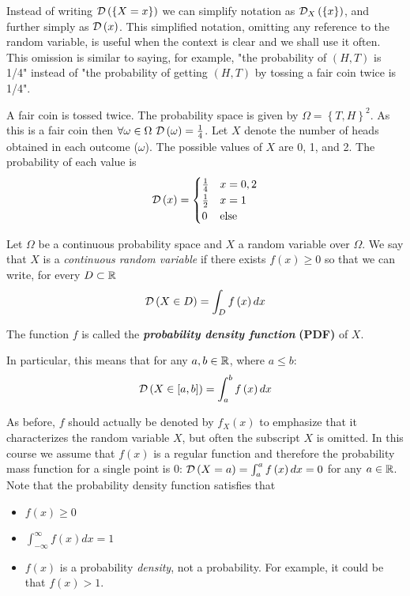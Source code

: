 Instead of writing $\mathcal{D}\left(\left\{ X=x\right\} \right)$ we can simplify notation as $\mathcal{D}_X\left(\left\{ x\right\} \right)$, and further simply as $\mathcal{D}\left(x\right)$. This simplified notation, omitting any reference to the random variable, is useful when the context is clear and we shall use it often. This omission is similar to saying, for example,  "the probability of $\left(H,T\right)$ is 1/4" instead of "the probability of getting $\left(H,T\right)$ by tossing a fair coin twice is 1/4".

\begin{example}
A fair coin is tossed twice. The probability space is given by $\Omega=\left\{ T,H\right\} ^{2}$. As this is a fair coin then $\forall \omega\in\Omega \,\, \mathcal{D}\left(\omega\right)=\frac{1}{4}$. Let $X$ denote the number of heads obtained in each outcome ($\omega$). The possible values of $X$ are 0, 1, and 2. The probability of each value is
	\[
	\mathcal{D}\left(x\right)=\begin{cases}
		\frac{1}{4} & x=0,2\\
		\frac{1}{2} & x=1\\
		0 & \mbox{else}
	\end{cases}
	\]
\end{example}


\begin{definition}
Let $\Omega$ be a continuous probability space and $X$ a random variable over $\Omega$. We say that $X$ is a \textit{continuous random variable} if there exists $f\left(x\right)\ge 0$ so that we can write, for every $D\subset\mathbb{R}$
\[
\mathcal{D}\left(X\in D\right)=\int_{D}f\left(x\right)dx
\]

The function $f$ is called the \textbf{\textit{probability density function }} \textbf{(PDF)} of $X$.
\end{definition}

In particular, this means that for any $a,b\in \mathbb{R}$, where $a\leq b$:
\[
\mathcal{D}\left(X\in\left[a,b\right]\right)=\int_{a}^{b}f\left(x\right)dx
\]

As before, $f$ should actually be denoted by $f_X\left(x\right)$ to emphasize that it characterizes the random variable $X$, but often the subscript $X$ is omitted. In this course we assume that $f(x)$ is a regular function and therefore the probability mass function for a single point is 0: $\mathcal{D}\left(X=a\right)=\int_{a}^{a}f\left(x\right)dx=0$ for any $a\in\mathbb{R}$. Note that the probability density function satisfies that
\begin{itemize}
	\item $f\left(x\right)\ge0$
	\item $\int_{-\infty}^{\infty}f\left(x\right)dx=1$
	\item $f\left(x\right)$ is a probability \emph{density}, not a probability. For example, it could be that $f\left(x\right)>1$.
\end{itemize}

